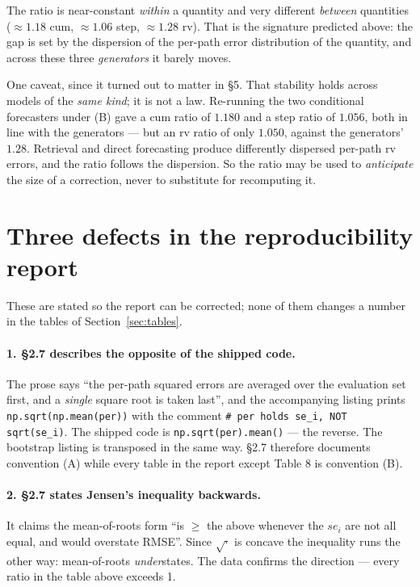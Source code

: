 \documentclass[11pt,a4paper]{article}
\begin{document}
The ratio is near-constant \emph{within} a quantity and very different
\emph{between} quantities ($\approx 1.18$ cum, $\approx 1.06$ step,
$\approx 1.28$ rv). That is the signature predicted above: the gap is set by the
dispersion of the per-path error distribution of the quantity, and across these
three \emph{generators} it barely moves.

One caveat, since it turned out to matter in \S5. That stability holds across
models of the \emph{same kind}; it is not a law. Re-running the two conditional
forecasters under (B) gave a cum ratio of $1.180$ and a step ratio of $1.056$,
both in line with the generators --- but an rv ratio of only $1.050$, against the
generators' $1.28$. Retrieval and direct forecasting produce differently
dispersed per-path rv errors, and the ratio follows the dispersion. So the ratio
may be used to \emph{anticipate} the size of a correction, never to substitute
for recomputing it.


\section{Three defects in the reproducibility report}

These are stated so the report can be corrected; none of them changes a number
in the tables of Section~\ref{sec:tables}.

\paragraph{1. \S2.7 describes the opposite of the shipped code.} The prose says
``the per-path squared errors are averaged over the evaluation set first, and a
\emph{single} square root is taken last'', and the accompanying listing prints
\texttt{np.sqrt(np.mean(per))} with the comment \texttt{\# per holds se\_i, NOT
sqrt(se\_i)}. The shipped code is \texttt{np.sqrt(per).mean()} --- the reverse.
The bootstrap listing is transposed in the same way. \S2.7 therefore documents
convention (A) while every table in the report except Table 8 is convention (B).

\paragraph{2. \S2.7 states Jensen's inequality backwards.} It claims the
mean-of-roots form ``is $\ge$ the above whenever the $se_i$ are not all equal,
and would overstate RMSE''. Since $\sqrt{\cdot}$ is concave the inequality runs
the other way: mean-of-roots \emph{under}states. The data confirms the direction
--- every ratio in the table above exceeds 1.
\end{document}
